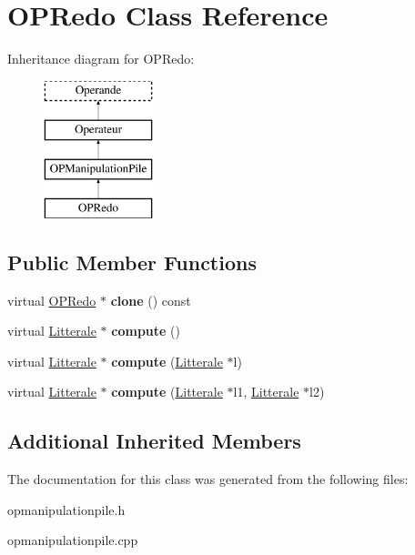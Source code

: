 \hypertarget{class_o_p_redo}{}\section{O\+P\+Redo Class Reference}
\label{class_o_p_redo}
Inheritance diagram for O\+P\+Redo\+:\begin{figure}[H]
\begin{center}
\leavevmode
\includegraphics[height=4.000000cm]{class_o_p_redo}
\end{center}
\end{figure}
\subsection*{Public Member Functions}
\begin{DoxyCompactItemize}
\item 
virtual \hyperlink{class_o_p_redo}{O\+P\+Redo} $\ast$ {\bfseries clone} () const \hypertarget{class_o_p_redo_afcbce83d13bac98e74661980ce5f4e34}{}\label{class_o_p_redo_afcbce83d13bac98e74661980ce5f4e34}

\item 
virtual \hyperlink{class_litterale}{Litterale} $\ast$ {\bfseries compute} ()\hypertarget{class_o_p_redo_aa794c07a788d5a23d37914f713d2939d}{}\label{class_o_p_redo_aa794c07a788d5a23d37914f713d2939d}

\item 
virtual \hyperlink{class_litterale}{Litterale} $\ast$ {\bfseries compute} (\hyperlink{class_litterale}{Litterale} $\ast$l)\hypertarget{class_o_p_redo_ae971828a6ae3ba538461bba6ebb00974}{}\label{class_o_p_redo_ae971828a6ae3ba538461bba6ebb00974}

\item 
virtual \hyperlink{class_litterale}{Litterale} $\ast$ {\bfseries compute} (\hyperlink{class_litterale}{Litterale} $\ast$l1, \hyperlink{class_litterale}{Litterale} $\ast$l2)\hypertarget{class_o_p_redo_afebdb64e5647f024961dbbae578d96cb}{}\label{class_o_p_redo_afebdb64e5647f024961dbbae578d96cb}

\end{DoxyCompactItemize}
\subsection*{Additional Inherited Members}


The documentation for this class was generated from the following files\+:\begin{DoxyCompactItemize}
\item 
opmanipulationpile.\+h\item 
opmanipulationpile.\+cpp\end{DoxyCompactItemize}
